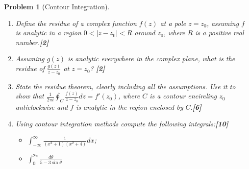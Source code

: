 \documentclass[a4paper]{article}
\theoremstyle{new}
\newtheorem{qns}{Problem}[section]
\begin{document}
\begin{qns}[Contour Integration]\leavevmode
\begin{enumerate}[label=(\alph*)]
\item Define the residue of a complex function $f(z)$ at a pole $z = z_0$, assuming $f$ is analytic in a region $0 < |z − z_0| < R$ around $z_0$, where $R$ is a positive real number.\hfill\textbf{[2]}
\item Assuming $g(z)$ is analytic everywhere in the complex plane, what is the residue of $\frac{g(z)}{z-z_0}$ at $z = z_0$? \hfill\textbf{[2]}
\item State the residue theorem, clearly including all the assumptions. Use it to show that $\frac{1}{2\pi i}\oint_C\frac{f(z)}{z-z_0}dz=f'(z_0)$, where $C$ is a contour encircling $z_0$ anticlockwise and $f$ is analytic in the region enclosed by $C$.\hfill\textbf{[6]}
\item Using contour integration methods compute the following integrals:\hfill\textbf{[10]}
\begin{itemize}
    \item $\int_{-\infty}^\infty\frac{1}{(x^2+1)(x^2+4)}dx$;
    \item $\int_0^{2\pi}\frac{d\theta}{5-3\sin\theta}$
\end{itemize}
\end{enumerate}
\end{qns}
\end{document}
